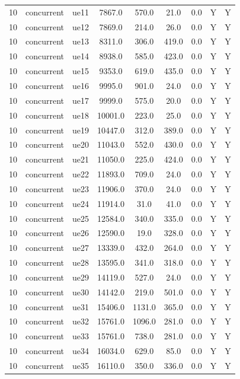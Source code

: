 \begin{table}[ht]
\begin{tabular}{|c|c|c|c|c|c|c|c|c|}
10 & concurrent & ue11 & 7867.0 & 570.0 & 21.0 & 0.0 & Y & Y \\
10 & concurrent & ue12 & 7869.0 & 214.0 & 26.0 & 0.0 & Y & Y \\
10 & concurrent & ue13 & 8311.0 & 306.0 & 419.0 & 0.0 & Y & Y \\
10 & concurrent & ue14 & 8938.0 & 585.0 & 423.0 & 0.0 & Y & Y \\
10 & concurrent & ue15 & 9353.0 & 619.0 & 435.0 & 0.0 & Y & Y \\
10 & concurrent & ue16 & 9995.0 & 901.0 & 24.0 & 0.0 & Y & Y \\
10 & concurrent & ue17 & 9999.0 & 575.0 & 20.0 & 0.0 & Y & Y \\
10 & concurrent & ue18 & 10001.0 & 223.0 & 25.0 & 0.0 & Y & Y \\
10 & concurrent & ue19 & 10447.0 & 312.0 & 389.0 & 0.0 & Y & Y \\
10 & concurrent & ue20 & 11043.0 & 552.0 & 430.0 & 0.0 & Y & Y \\
10 & concurrent & ue21 & 11050.0 & 225.0 & 424.0 & 0.0 & Y & Y \\
10 & concurrent & ue22 & 11893.0 & 709.0 & 24.0 & 0.0 & Y & Y \\
10 & concurrent & ue23 & 11906.0 & 370.0 & 24.0 & 0.0 & Y & Y \\
10 & concurrent & ue24 & 11914.0 & 31.0 & 41.0 & 0.0 & Y & Y \\
10 & concurrent & ue25 & 12584.0 & 340.0 & 335.0 & 0.0 & Y & Y \\
10 & concurrent & ue26 & 12590.0 & 19.0 & 328.0 & 0.0 & Y & Y \\
10 & concurrent & ue27 & 13339.0 & 432.0 & 264.0 & 0.0 & Y & Y \\
10 & concurrent & ue28 & 13595.0 & 341.0 & 318.0 & 0.0 & Y & Y \\
10 & concurrent & ue29 & 14119.0 & 527.0 & 24.0 & 0.0 & Y & Y \\
10 & concurrent & ue30 & 14142.0 & 219.0 & 501.0 & 0.0 & Y & Y \\
10 & concurrent & ue31 & 15406.0 & 1131.0 & 365.0 & 0.0 & Y & Y \\
10 & concurrent & ue32 & 15761.0 & 1096.0 & 281.0 & 0.0 & Y & Y \\
10 & concurrent & ue33 & 15761.0 & 738.0 & 281.0 & 0.0 & Y & Y \\
10 & concurrent & ue34 & 16034.0 & 629.0 & 85.0 & 0.0 & Y & Y \\
10 & concurrent & ue35 & 16110.0 & 350.0 & 336.0 & 0.0 & Y & Y \\

\end{tabular}
\end{table}
